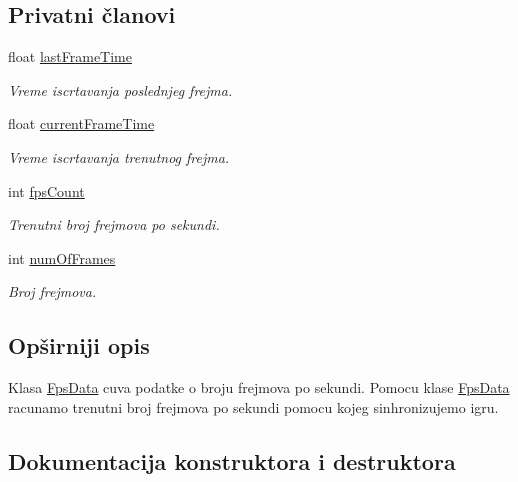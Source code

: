 \subsection*{Privatni članovi}
\begin{DoxyCompactItemize}
\item 
float \hyperlink{classutility_1_1FpsData_a0340fb16b83e32835d5e8327b5b322e3}{last\+Frame\+Time}
\begin{DoxyCompactList}\small\item\em Vreme iscrtavanja poslednjeg frejma. \end{DoxyCompactList}\item 
float \hyperlink{classutility_1_1FpsData_a8d446a1d25857ec240d8fe91a8db0e47}{current\+Frame\+Time}
\begin{DoxyCompactList}\small\item\em Vreme iscrtavanja trenutnog frejma. \end{DoxyCompactList}\item 
int \hyperlink{classutility_1_1FpsData_a72384b61915ece78bad19d36cfc0de41}{fps\+Count}
\begin{DoxyCompactList}\small\item\em Trenutni broj frejmova po sekundi. \end{DoxyCompactList}\item 
int \hyperlink{classutility_1_1FpsData_acbf0bbe28e4d134e959970b252bc1bc1}{num\+Of\+Frames}
\begin{DoxyCompactList}\small\item\em Broj frejmova. \end{DoxyCompactList}\end{DoxyCompactItemize}


\subsection{Opširniji opis}
Klasa \hyperlink{classutility_1_1FpsData}{Fps\+Data} cuva podatke o broju frejmova po sekundi. Pomocu klase \hyperlink{classutility_1_1FpsData}{Fps\+Data} racunamo trenutni broj frejmova po sekundi pomocu kojeg sinhronizujemo igru. 

\subsection{Dokumentacija konstruktora i destruktora}
\mbox{\label{classutility_1_1FpsData_a74340a4b4ca45996749c4393fdf6d9b2}} 
